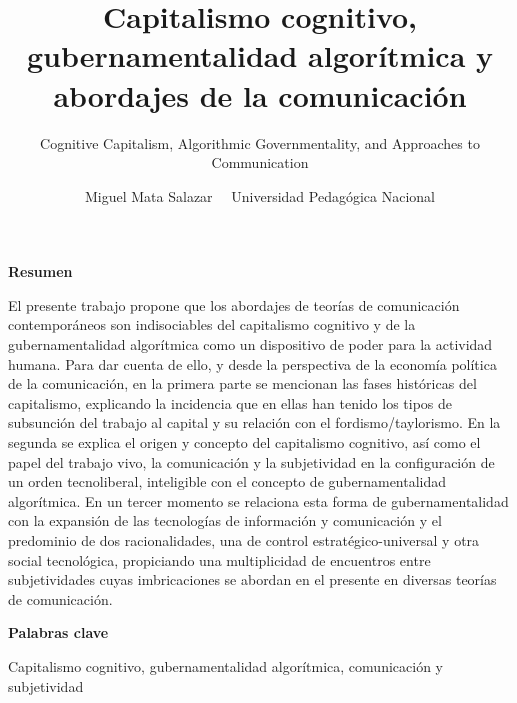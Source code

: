 \documentclass[
]{interact}
\title{Capitalismo cognitivo, gubernamentalidad algorítmica y abordajes
de la comunicación}
\subtitle{Cognitive Capitalism, Algorithmic Governmentality, and
Approaches to Communication}
\author{Miguel Mata Salazar \textbar\ \textbar\ 
Universidad Pedagógica Nacional}
\begin{document}
\captionsetup{labelsep=space}
\maketitle


\newcommand{\articuloTitulo}{Capitalismo Cognitivo}

\begin{footnotesize}
\textbf{Resumen}

El presente trabajo propone que los abordajes de teorías de comunicación contemporáneos son indisociables del capitalismo cognitivo y de la gubernamentalidad algorítmica como un dispositivo de poder para la actividad humana. Para dar cuenta de ello, y desde la perspectiva de la economía política de la comunicación, en la primera parte se mencionan las fases históricas del capitalismo, explicando la incidencia que en ellas han tenido los tipos de subsunción del trabajo al capital y su relación con el fordismo/taylorismo. En la segunda se explica el origen y concepto del capitalismo cognitivo, así como el papel del trabajo vivo, la comunicación y la subjetividad en la configuración de un orden tecnoliberal, inteligible con el concepto de gubernamentalidad algorítmica. En un tercer momento se relaciona esta forma de gubernamentalidad con la expansión de las tecnologías de información y comunicación y el predominio de dos racionalidades, una de control estratégico-universal y otra social tecnológica, propiciando una multiplicidad de encuentros entre subjetividades cuyas imbricaciones se abordan en el presente en diversas teorías de comunicación.

\textbf{Palabras clave}

Capitalismo cognitivo, gubernamentalidad algorítmica, comunicación y  subjetividad
\end{footnotesize}

\newpage
\end{document}
